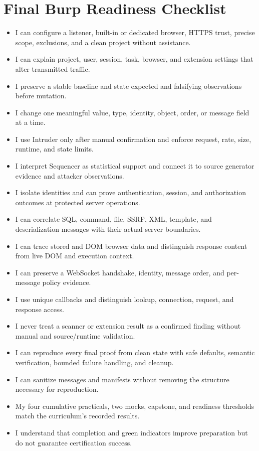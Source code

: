 \documentclass[11pt]{article}
\begin{document}
\section{Final Burp Readiness Checklist}

\begin{itemize}[label=$\square$]
  \item I can configure a listener, built-in or dedicated browser, HTTPS trust, precise scope, exclusions, and a clean project without assistance.
  \item I can explain project, user, session, task, browser, and extension settings that alter transmitted traffic.
  \item I preserve a stable baseline and state expected and falsifying observations before mutation.
  \item I change one meaningful value, type, identity, object, order, or message field at a time.
  \item I use Intruder only after manual confirmation and enforce request, rate, size, runtime, and state limits.
  \item I interpret Sequencer as statistical support and connect it to source generator evidence and attacker observations.
  \item I isolate identities and can prove authentication, session, and authorization outcomes at protected server operations.
  \item I can correlate SQL, command, file, SSRF, XML, template, and deserialization messages with their actual server boundaries.
  \item I can trace stored and DOM browser data and distinguish response content from live DOM and execution context.
  \item I can preserve a WebSocket handshake, identity, message order, and per-message policy evidence.
  \item I use unique callbacks and distinguish lookup, connection, request, and response access.
  \item I never treat a scanner or extension result as a confirmed finding without manual and source/runtime validation.
  \item I can reproduce every final proof from clean state with safe defaults, semantic verification, bounded failure handling, and cleanup.
  \item I can sanitize messages and manifests without removing the structure necessary for reproduction.
  \item My four cumulative practicals, two mocks, capstone, and readiness thresholds match the curriculum's recorded results.
  \item I understand that completion and green indicators improve preparation but do not guarantee certification success.
\end{itemize}
\end{document}
